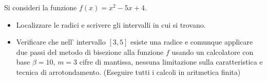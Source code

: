 Si consideri la funzione $f(x)=x^2-5x+4$.
\begin{itemize}
\item  Localizzare le radici e
scrivere gli intervalli in cui si trovano.
\item Verificare che nell' intervallo $[3, 5]$ esiste una radice e comunque applicare due passi del
metodo di bisezione alla funzione $f$ usando un calcolatore con
base $\beta =10$, $m=3$ cifre di mantissa, nessuna limitazione
sulla caratteristica e tecnica di arrotondamento. (Eseguire tutti
i calcoli in aritmetica finita)
\end{itemize}
